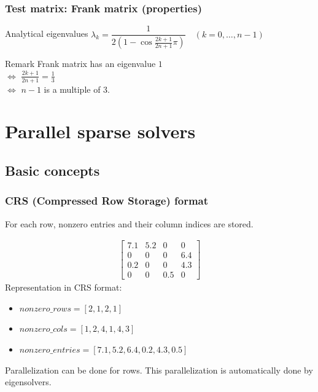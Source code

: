 \begin{frame}[c,fragile]
  \frametitle{Test matrix: Frank matrix (properties)}
\begin{block}{Analytical eigenvalues}%
$\lambda_k = \dfrac{1}{2 \left( 1 - \cos{\tfrac{2 k + 1}{2 n + 1}\pi} \right)} \quad (k=0,\dots,n-1)$
\end{block}

\begin{block}{Remark}%
Frank matrix has an eigenvalue $1$\\
\quad $\Longleftrightarrow$ $\tfrac{2 k + 1}{2 n + 1} = \tfrac{1}{3}$\\
\quad $\Longleftrightarrow$ $n-1$ is a multiple of 3.
\end{block}
\end{frame}

\section{Parallel sparse solvers}

\subsection{Basic concepts}

\begin{frame}[c,fragile]
  \frametitle{CRS (Compressed Row Storage) format}
For each row, nonzero entries and their column indices are stored.

\begin{rei}%
\vspace{-2\baselineskip}
\begin{align*}
\begin{bmatrix}
7.1 & 5.2 & 0 & 0 \\
0 & 0 & 0 & 6.4 \\
0.2 & 0 & 0 & 4.3 \\
0 & 0 & 0.5 & 0
\end{bmatrix}
\end{align*}
Representation in CRS format:
\begin{itemize}
\item $nonzero\_rows = [2, 1, 2, 1]$
\item $nonzero\_cols = [1, 2, 4, 1, 4, 3]$
\item $nonzero\_entries = [7.1, 5.2, 6.4, 0.2, 4.3, 0.5]$
\end{itemize}
\end{rei}

Parallelization can be done for rows.
This parallelization is automatically done by eigensolvers.

\end{frame}

